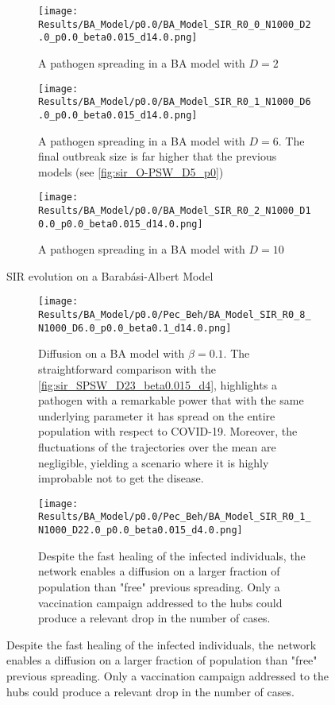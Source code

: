 \documentclass[a4paper,10pt,twoside]{book} %
\theoremstyle{definition}
\begin{document}
\clearpage
\begin{figure}[H]
	\begin{subfigure}{\linewidth}
		\texttt{[image: Results/BA\_Model/p0.0/BA\_Model\_SIR\_R0\_0\_N1000\_D2.0\_p0.0\_beta0.015\_d14.0.png]}
		\caption{A pathogen spreading in a BA model with $D = 2$}
		\label{fig:sir_BA_D2}
	\end{subfigure}
	\vspace{.5cm}
	\begin{subfigure}{\linewidth}
		\texttt{[image: Results/BA\_Model/p0.0/BA\_Model\_SIR\_R0\_1\_N1000\_D6.0\_p0.0\_beta0.015\_d14.0.png]}
		\caption{A pathogen spreading in a BA model with $D = 6$. The final outbreak size is far higher that the previous models (see \autoref{fig:sir_O-PSW_D5_p0})}
		\label{fig:sir_BA_D6}
	\end{subfigure}
	\vspace{.5cm}
	\begin{subfigure}{\linewidth}
		\texttt{[image: Results/BA\_Model/p0.0/BA\_Model\_SIR\_R0\_2\_N1000\_D10.0\_p0.0\_beta0.015\_d14.0.png]}
		\caption{A pathogen spreading in a BA model with $D = 10$}
		\label{fig:sir_BA_D10}
	\end{subfigure}
	\caption{SIR evolution on a Barabási-Albert Model}
	\label{fig:sir_BA_COVID}
\end{figure}

\clearpage
\begin{figure}[H]
	\begin{subfigure}{\linewidth}
		\centering
		\texttt{[image: Results/BA\_Model/p0.0/Pec\_Beh/BA\_Model\_SIR\_R0\_8\_N1000\_D6.0\_p0.0\_beta0.1\_d14.0.png]}
		\caption{Diffusion on a BA model with $\beta = 0.1$. The straightforward comparison with the \autoref{fig:sir_SPSW_D23_beta0.015_d4}, highlights a pathogen with a remarkable power that with the same underlying parameter it has spread on the entire population with respect to COVID-19. Moreover, the fluctuations of the trajectories over the mean are negligible, yielding a scenario where it is highly improbable not to get the disease.}
		\label{fig:sir_BA_D6_b0.1}
	\end{subfigure}
	\par\bigskip
	\begin{subfigure}{\linewidth}
		\centering
		\texttt{[image: Results/BA\_Model/p0.0/Pec\_Beh/BA\_Model\_SIR\_R0\_1\_N1000\_D22.0\_p0.0\_beta0.015\_d4.0.png]}
		\caption{Despite the fast healing of the infected individuals, the network enables a diffusion on a larger fraction of population than "free" previous spreading. Only a vaccination campaign addressed to the hubs could produce a relevant drop in the number of cases.}
		\label{fig:sir_BA_d1D47}
	\end{subfigure}
\end{figure}
\end{document}

